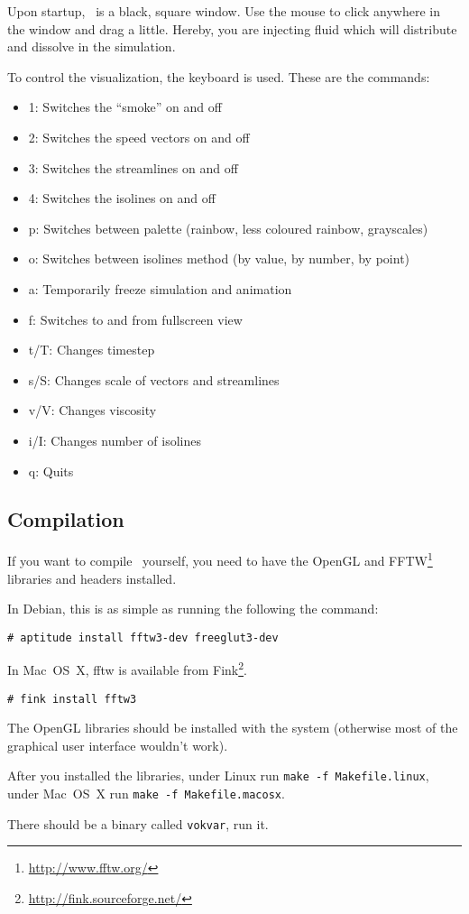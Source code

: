
Upon startup, \fluids\ is a black, square window. Use the mouse to click
anywhere in the window and drag a little. Hereby, you are injecting fluid which
will distribute and dissolve in the simulation.

To control the visualization, the keyboard is used. These are the commands:

\begin{itemize}
  \item{1:} Switches the ``smoke'' on and off
  \item{2:} Switches the speed vectors on and off
  \item{3:} Switches the streamlines on and off
  \item{4:} Switches the isolines on and off
  \item{p:} Switches between palette (rainbow, less coloured rainbow, grayscales)
  \item{o:} Switches between isolines method (by value, by number, by point)
  \item{a:} Temporarily freeze simulation and animation
  \item{f:} Switches to and from fullscreen view
  \item{t/T:} Changes timestep
  \item{s/S:} Changes scale of vectors and streamlines
  \item{v/V:} Changes viscosity
  \item{i/I:} Changes number of isolines
  \item{q:} Quits \fluids\
\end{itemize}

\subsection{Compilation}

If you want to compile \fluids\ yourself, you need to have the OpenGL and
FFTW\footnote{\url{http://www.fftw.org/}} libraries and headers installed.

In Debian, this is as simple as running the following the command:

\texttt{\# aptitude install fftw3-dev freeglut3-dev}

In Mac~OS~X, fftw is available from Fink\footnote{\url{http://fink.sourceforge.net/}}.

\texttt{\# fink install fftw3}

The OpenGL libraries should be installed with the system (otherwise most of the
graphical user interface wouldn't work).

After you installed the libraries, under Linux run \texttt{make -f
Makefile.linux}, under Mac~OS~X run \texttt{make -f Makefile.macosx}.

There should be a binary called \texttt{vokvar}, run it.


